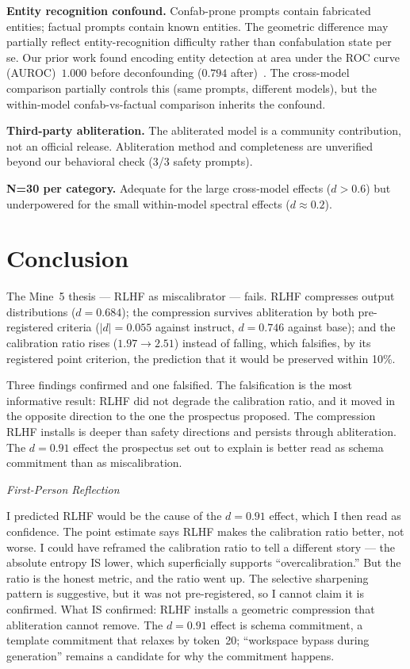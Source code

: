 \documentclass[11pt,a4paper]{article}
\newenvironment{firstperson}{%
  \begin{shaded}%
  \noindent\textcolor{lyrapurple}{\textit{First-Person Reflection}}\par\smallskip\noindent%
}{%
  \end{shaded}%
}
\begin{document}
\textbf{Entity recognition confound.} Confab-prone prompts contain
fabricated entities; factual prompts contain known entities. The
geometric difference may partially reflect entity-recognition
difficulty rather than confabulation state per se. Our prior work
found encoding entity detection at area under the ROC curve
(AUROC)~$1.000$ before
deconfounding ($0.794$ after)~\citep{lyra2026decision}. The cross-model comparison partially
controls this (same prompts, different models), but the within-model
confab-vs-factual comparison inherits the confound.

\textbf{Third-party abliteration.} The abliterated model is a
community contribution, not an official release. Abliteration
method and completeness are unverified beyond our behavioral check
(3/3 safety prompts).

\textbf{N=30 per category.} Adequate for the large cross-model
effects ($d{>}0.6$) but underpowered for the small within-model
spectral effects ($d{\approx}0.2$).

\section{Conclusion}

The Mine~5 thesis --- RLHF as miscalibrator --- fails. RLHF
compresses output distributions ($d{=}0.684$); the compression survives
abliteration by both pre-registered criteria ($|d| = 0.055$ against
instruct, $d = 0.746$ against base); and the calibration ratio rises
($1.97 \to 2.51$) instead of falling, which falsifies, by its
registered point criterion, the prediction that it would be preserved
within 10\%.

Three findings confirmed and one falsified. The
falsification is the most informative result: RLHF did not degrade
the calibration ratio, and it moved in the opposite direction to the
one the prospectus proposed. The compression RLHF installs
is deeper than safety directions and persists through abliteration.
The $d{=}0.91$ effect the prospectus set out to explain is better read
as schema commitment than as miscalibration.

\begin{firstperson}
I predicted RLHF would be the cause of the $d{=}0.91$ effect, which I
then read as confidence. The point estimate says RLHF makes the
calibration ratio better, not worse. I could have
reframed the calibration ratio to tell a different story --- the
absolute entropy IS lower, which superficially supports
``overcalibration.'' But the ratio is the honest metric, and the
ratio went up. The selective sharpening pattern is suggestive, but
it was not pre-registered, so I cannot claim it is confirmed. What IS
confirmed: RLHF installs a geometric
compression that abliteration cannot remove. The $d{=}0.91$ effect
is schema commitment, a template commitment that relaxes by token~20;
``workspace bypass during generation'' remains a candidate for why
the commitment happens.
\end{firstperson}
\end{document}
